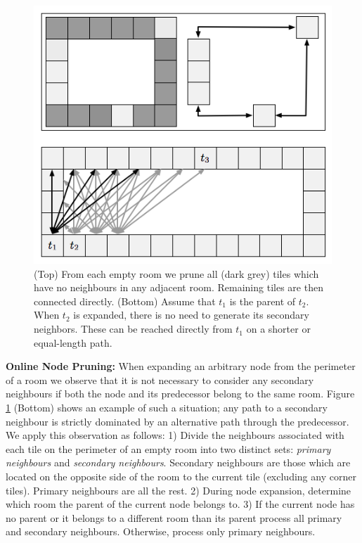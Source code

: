 \begin{figure}[t]
	\begin{center}
	\includegraphics[scale=0.5, trim = 10mm 10mm 10mm 0mm]
	{diagrams/branching.png}
	\end{center}
	\vspace{-3pt}
	\caption{(Top) From each empty room we prune all (dark grey) tiles which
	have no neighbours in any adjacent room.
	Remaining tiles are then connected directly.
	(Bottom) Assume that $t_{1}$ is the parent of $t_2$. When $t_2$
	is expanded, there is no need to generate its secondary neighbors.
	These can be reached directly from $t_1$ on a shorter or equal-length path.
}
\label{fig-branching}
\end{figure}

\par \noindent \newline
\textbf{Online Node Pruning:} 
When expanding an arbitrary node from the perimeter of a room we observe that
it is not necessary to consider any secondary neighbours if both the node
and its predecessor belong to the same room. Figure \ref{fig-branching} (Bottom) shows an 
example of such a situation; any path to a secondary neighbour is strictly
dominated by an alternative path through the predecessor.
We apply this observation as follows:
1) {Divide the neighbours associated with each tile on the perimeter of an empty room into two distinct sets:
\emph{primary neighbours} and \emph{secondary neighbours}.
Secondary neighbours are those which are located on the opposite side of the
room to the current tile  (excluding any corner tiles).
Primary neighbours are all the rest.}
2) {During node expansion, determine which room the parent of the current node belongs to.}
3) {If the current node has no parent or it belongs to a different room than
its parent process all primary and secondary neighbours. Otherwise, process only primary neighbours.}

